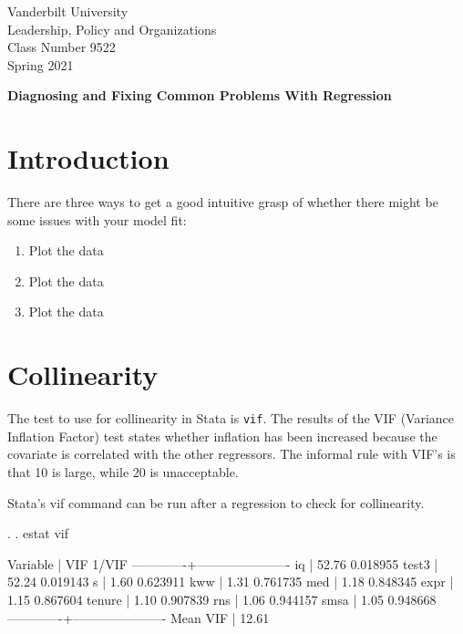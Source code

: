 \documentclass[12pt]{article}
\begin{document}
\thispagestyle{empty}%


\setlength{\parskip}{1ex plus 0.5ex minus 0.2ex}

\setcounter{secnumdepth}{-2}



\begin{flushleft}
Vanderbilt University\\Leadership, Policy and Organizations\\Class Number 9522\\ Spring 2021\\
\end{flushleft}

\begin{center}
\textbf{Diagnosing and Fixing Common Problems With Regression}
\end{center}

\section{Introduction}
\label{sec:introduction}

There are three ways to get a good intuitive grasp of whether there
might be some issues with your model fit:

\begin{enumerate}
\item Plot the data

\item Plot the data

\item Plot the data
\end{enumerate}


\section{Collinearity}
\label{sec:collinearity}

The test to use for collinearity in Stata is \texttt{vif}. The results
of the VIF (Variance Inflation Factor) test states whether inflation
has been increased because the covariate is correlated with the other
regressors. The informal rule with VIF's is that 10 is large, while 20
is unacceptable.

Stata's vif command can be run after a regression to check for
collinearity. 

\begin{stlog}
  
. 
. estat vif

    Variable |       VIF       1/VIF  
-------------+----------------------
          iq |     52.76    0.018955
       test3 |     52.24    0.019143
           s |      1.60    0.623911
         kww |      1.31    0.761735
         med |      1.18    0.848345
        expr |      1.15    0.867604
      tenure |      1.10    0.907839
         rns |      1.06    0.944157
        smsa |      1.05    0.948668
-------------+----------------------
    Mean VIF |     12.61

\end{stlog}
\end{document}
